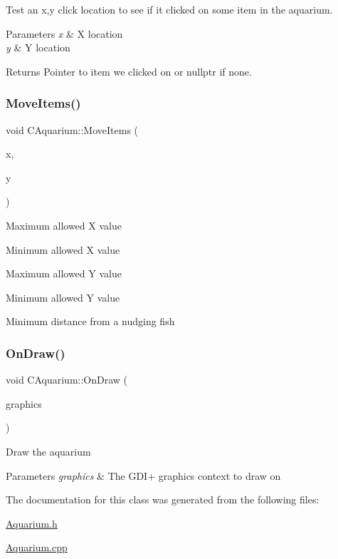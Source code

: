 Test an x,y click location to see if it clicked on some item in the aquarium. 
\begin{DoxyParams}{Parameters}
{\em x} & X location \\
\hline
{\em y} & Y location \\
\hline
\end{DoxyParams}
\begin{DoxyReturn}{Returns}
Pointer to item we clicked on or nullptr if none. 
\end{DoxyReturn}
\mbox{\label{class_c_aquarium_a6cc92fa921b94d304933d6ae97524365}} 
\subsubsection{\texorpdfstring{MoveItems()}{MoveItems()}}
{\footnotesize\ttfamily void C\+Aquarium\+::\+Move\+Items (\begin{DoxyParamCaption}\item[{double}]{x,  }\item[{double}]{y }\end{DoxyParamCaption})}

Maximum allowed X value

Minimum allowed X value

Maximum allowed Y value

Minimum allowed Y value

Minimum distance from a nudging fish \mbox{\label{class_c_aquarium_a20b4899158d1ba4bc41217630d47e180}} 
\subsubsection{\texorpdfstring{OnDraw()}{OnDraw()}}
{\footnotesize\ttfamily void C\+Aquarium\+::\+On\+Draw (\begin{DoxyParamCaption}\item[{Gdiplus\+::\+Graphics $\ast$}]{graphics }\end{DoxyParamCaption})}

Draw the aquarium 
\begin{DoxyParams}{Parameters}
{\em graphics} & The G\+D\+I+ graphics context to draw on \\
\hline
\end{DoxyParams}


The documentation for this class was generated from the following files\+:\begin{DoxyCompactItemize}
\item 
\mbox{\hyperlink{_aquarium_8h}{Aquarium.\+h}}\item 
\mbox{\hyperlink{_aquarium_8cpp}{Aquarium.\+cpp}}\end{DoxyCompactItemize}
